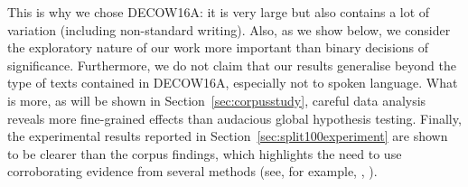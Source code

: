 This is why we chose DECOW16A: it is very large but also contains a lot of variation (including non-standard writing).
Also, as we show below, we consider the exploratory nature of our work more important than binary decisions of significance.
Furthermore, we do not claim that our results generalise beyond the type of texts contained in DECOW16A, especially not to spoken language.
What is more, as will be shown in Section~\ref{sec:corpusstudy}, careful data analysis reveals more fine-grained effects than audacious global hypothesis testing.
Finally, the experimental results reported in Section~\ref{sec:split100experiment} are shown to be clearer than the corpus findings, which highlights the need to use corroborating evidence from several methods (see, for example, \citealt{ArppeJaervikivi2007}, \citealt{DivjakEa2016a}).
